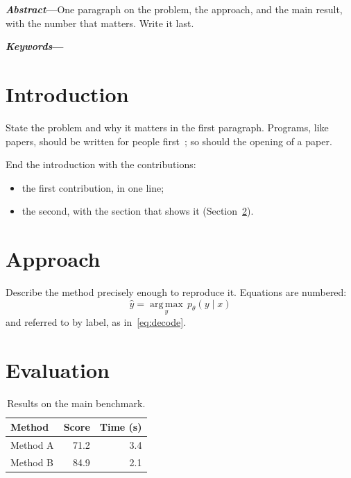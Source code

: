 \noindent\textbf{\textit{Abstract}---}One paragraph on the problem, the
approach, and the main result, with the number that matters. Write it last.

\smallskip
\noindent\textbf{\textit{Keywords}---}\paperkeywords

\section{Introduction}
\label{sec:introduction}

State the problem and why it matters in the first paragraph. Programs, like
papers, should be written for people first~\citep{knuth1984}; so should the
opening of a paper.

End the introduction with the contributions:
\begin{itemize}
  \item the first contribution, in one line;
  \item the second, with the section that shows it
    (Section~\ref{sec:approach}).
\end{itemize}

\section{Approach}
\label{sec:approach}

Describe the method precisely enough to reproduce it. Equations are numbered:
\begin{equation}
  \hat{y} = \operatorname*{arg\,max}_{y}\, p_\theta(y \mid x)
  \label{eq:decode}
\end{equation}
and referred to by label, as in~\eqref{eq:decode}.

\section{Evaluation}
\label{sec:evaluation}

\begin{table}[htbp]
  \centering
  \caption{Results on the main benchmark.}
  \label{tab:main}
  \begin{tabular}{lrr}
    \toprule
    Method   & Score & Time (s) \\
    \midrule
    Method A & 71.2  & 3.4      \\
    Method B & 84.9  & 2.1      \\
    \bottomrule
  \end{tabular}
\end{table}

